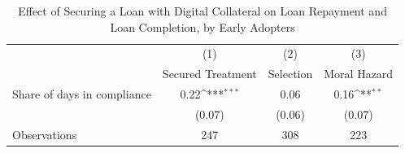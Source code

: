 \begin{table}[htbp]\centering
\def\sym#1{\ifmmode^{#1}\else\(^{#1}\)\fi}
\caption{Effect of Securing a Loan with Digital Collateral on Loan Repayment and Loan Completion, by Early Adopters\label{LASMH\_repay\_earlyadopt\_LATE\_150}}
\begin{tabular}{l*{3}{c}}
\toprule
                    &\multicolumn{1}{c}{(1)}&\multicolumn{1}{c}{(2)}&\multicolumn{1}{c}{(3)}\\
                    &\multicolumn{1}{c}{Secured Treatment}&\multicolumn{1}{c}{Selection}&\multicolumn{1}{c}{Moral Hazard}\\
\midrule
Share of days in compliance&        0.22\sym{***}&        0.06         &        0.16\sym{**} \\
                    &      (0.07)         &      (0.06)         &      (0.07)         \\
\midrule
Observations        &         247         &         308         &         223         \\
\bottomrule
\end{tabular}
\end{table}
